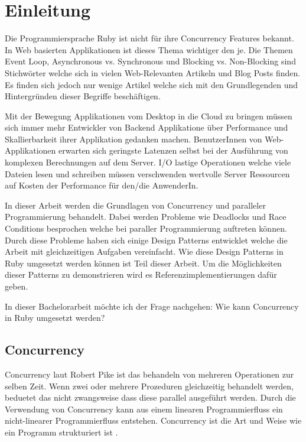 \section{Einleitung}
\label{section:Einleitung}

Die Programmiersprache Ruby ist nicht für ihre Concurrency Features bekannt. In Web basierten Applikationen ist dieses Thema wichtiger den je. Die Themen Event Loop, Asynchronous vs. Synchronous und Blocking vs. Non-Blocking sind Stichwörter welche sich in vielen Web-Relevanten Artikeln und Blog Posts finden. Es finden sich jedoch nur wenige Artikel welche sich mit den Grundlegenden und Hintergründen dieser Begriffe beschäftigen. 

Mit der Bewegung Applikationen vom Desktop in die Cloud zu bringen müssen sich immer mehr Entwickler von Backend Applikatione über Performance und Skallierbarkeit ihrer Applikation gedanken machen. BenutzerInnen von Web-Applikationen erwarten sich geringste Latenzen selbst bei der Ausführung von komplexen Berechnungen auf dem Server. I/O lastige Operationen welche viele Dateien lesen und schreiben müssen verschwenden wertvolle Server Ressourcen auf Kosten der Performance für den/die AnwenderIn.

In dieser Arbeit werden die Grundlagen von Concurrency und paralleler Programmierung behandelt. Dabei werden Probleme wie Deadlocks und Race Conditions besprochen welche bei paraller Programmierung auftreten können. Durch diese Probleme haben sich einige Design Patterns entwicklet welche die Arbeit mit gleichzeitigen Aufgaben vereinfacht. Wie diese Design Patterns in Ruby umgesetzt werden können ist Teil dieser Arbeit. Um die Möglichkeiten dieser Patterns zu demonstrieren wird es Referenzimplementierungen dafür geben. 

In dieser Bachelorarbeit möchte ich der Frage nachgehen: Wie kann Concurrency in Ruby umgesetzt werden?

\subsection{Concurrency}
\label{section:concurrency}

Concurrency laut Robert Pike ist das behandeln von mehreren Operationen zur selben Zeit. Wenn zwei oder mehrere Prozeduren gleichzeitig behandelt werden, beduetet das nicht zwangsweise dass diese parallel ausgeführt werden. Durch die Verwendung von Concurrency kann aus einem linearen Programmierfluss ein nicht-linearer Programmierfluss entstehen. Concurrency ist die Art und Weise wie ein Programm strukturiert ist \cite[]{Pik2013}.

